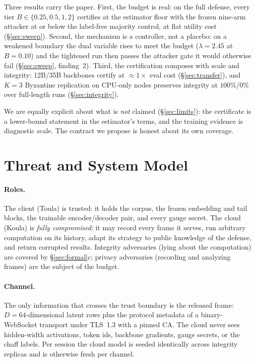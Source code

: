 \documentclass[10pt]{article}
\begin{document}
Three results carry the paper.  First, the budget is real: on the full
defense, every tier $B \in \{0.25, 0.5, 1, 2\}$ certifies at the
estimator floor with the frozen nine-arm attacker at or below the
label-free majority control, at flat utility cost
(\S\ref{sec:sweep}).  Second, the mechanism is a controller, not a
placebo: on a weakened boundary the dual variable rises to meet the
budget ($\lambda = 2.45$ at $B{=}0.10$) and the tightened run then passes
the attacker gate it would otherwise fail (\S\ref{sec:sweep},
finding~2).  Third, the certification composes with scale and integrity:
12B/35B backbones certify at $\approx 1\times$ eval cost
(\S\ref{sec:transfer}), and $K{=}3$ Byzantine replication on CPU-only
nodes preserves integrity at $100\%$/$0\%$ over full-length runs
(\S\ref{sec:integrity}).

We are equally explicit about what is \emph{not} claimed
(\S\ref{sec:limits}): the certificate is a lower-bound statement in the
estimator's terms, and the training evidence is diagnostic scale.  The
contract we propose is honest about its own coverage.

\section{Threat and System Model}
\label{sec:threat}

\paragraph{Roles.} The client (Toula) is trusted: it holds the corpus,
the frozen embedding and tail blocks, the trainable encoder/decoder pair,
and every gauge secret.  The cloud (Koula) is \emph{fully compromised}:
it may record every frame it serves, run arbitrary computation on its
history, adapt its strategy to public knowledge of the defense, and
return corrupted results.  Integrity adversaries (lying about the
computation) are covered by \S\ref{sec:formal}c; privacy adversaries
(recording and analyzing frames) are the subject of the budget.

\paragraph{Channel.} The only information that crosses the trust
boundary is the released frame: $D{=}64$-dimensional latent rows plus
the protocol metadata of a binary-WebSocket transport under TLS~1.3 with
a pinned CA.  The cloud never sees hidden-width activations, token ids,
backbone gradients, gauge secrets, or the chaff labels.  Per session the
cloud model is seeded identically across integrity replicas and is
otherwise fresh per channel.
\end{document}
